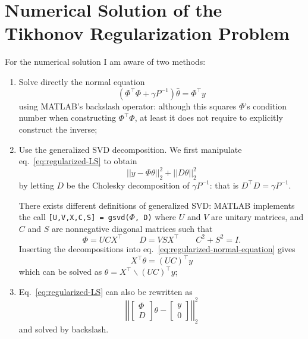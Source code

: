 \section{Numerical Solution of the Tikhonov Regularization Problem}
\label{sec:numerical-tikhonov}

For the numerical solution I am aware of two methods:
  \begin{enumerate}
  \item Solve directly the normal equation
    \begin{equation}
      \label{eq:regularized-normal-equation}
      \left(\Phi^\top\Phi + \gamma P^{-1}\right) \hat{\theta} = \Phi^\top y
    \end{equation} using MATLAB's backslash operator: although this squares $\Phi$'s condition number when constructing $\Phi^\top\Phi$, at least it does not require to explicitly construct the inverse;
  \item Use the generalized SVD decomposition.
    We first manipulate eq.~\eqref{eq:regularized-LS} to obtain
    \begin{equation*}
      ||y-\Phi \theta||_2^2 + ||D\theta||_2^2
    \end{equation*}
    by letting $D$ be the Cholesky decomposition of $\gamma P^{-1}$: that is $D^\top D = \gamma P^{-1}$.

    There exists different definitions of generalized SVD: MATLAB implements the call \texttt{[U,V,X,C,S] = gsvd($\Phi$, D)} where $U$ and $V$ are unitary matrices, and $C$ and $S$ are nonnegative diagonal matrices such that
    \begin{equation*}
      \Phi = UCX^\top\hspace{2em} D = VSX^\top\hspace{2em} C^2+S^2=I.
    \end{equation*}
    Inserting the decompositions into eq.~\eqref{eq:regularized-normal-equation} gives
    \begin{equation*}
      X^\top \theta = (UC)^\top y
    \end{equation*}
    which can be solved as $\theta = X^\top \backslash (UC)^\top y$;
  \item Eq.~\eqref{eq:regularized-LS} can also be rewritten as
    \begin{equation*}
      \left|\left|
          \begin{bmatrix}
            \Phi \\ D
          \end{bmatrix}\theta -
          \begin{bmatrix}
            y \\ 0
          \end{bmatrix}\right|\right|_2^2
    \end{equation*}
    and solved by backslash.


\end{enumerate}
